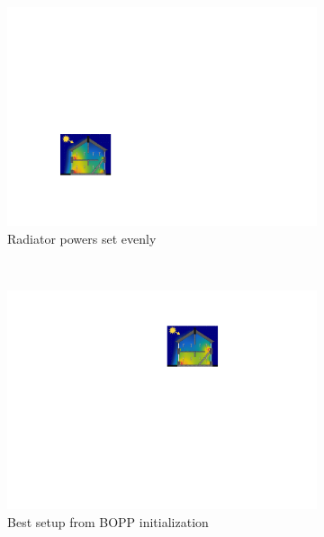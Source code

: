 \begin{figure}[p]
	\centering
	\begin{subfigure}[t]{0.47\textwidth}
		\includegraphics[width=\textwidth]{house-heating/even_powers.pdf}
		\caption{Radiator powers set evenly}
	\end{subfigure}
	~~~~ %
		\begin{subfigure}[t]{0.47\textwidth}
			\includegraphics[width=\textwidth]{house-heating/first_iter.pdf}
			\caption{Best setup from BOPP initialization}
		\end{subfigure} \\
		\vspace{10pt}
			\begin{subfigure}[t]{0.47\textwidth}

\end{subfigure}
\end{figure}
